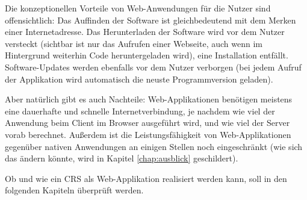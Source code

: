 Die konzeptionellen Vorteile von Web-Anwendungen für die Nutzer sind offensichtlich: Das Auffinden der Software ist gleichbedeutend mit dem Merken einer Internetadresse. Das Herunterladen der Software wird vor dem Nutzer versteckt (sichtbar ist nur das Aufrufen einer Webseite, auch wenn im Hintergrund weiterhin Code heruntergeladen wird), eine Installation entfällt. Software-Updates werden ebenfalls vor dem Nutzer verborgen (bei jedem Aufruf der Applikation wird automatisch die neuste Programmversion geladen).

Aber natürlich gibt es auch Nachteile: Web-Applikationen benötigen meistens eine dauerhafte und schnelle Internetverbindung, je nachdem wie viel der Anwendung beim Client im Browser ausgeführt wird, und wie viel der Server vorab berechnet. Außerdem ist die Leistungsfähigkeit von Web-Applikationen gegenüber nativen Anwendungen an einigen Stellen noch eingeschränkt (wie sich das ändern könnte, wird in Kapitel \ref{chap:ausblick} geschildert).

Ob und wie ein CRS als Web-Applikation realisiert werden kann, soll in den folgenden Kapiteln überprüft werden.

